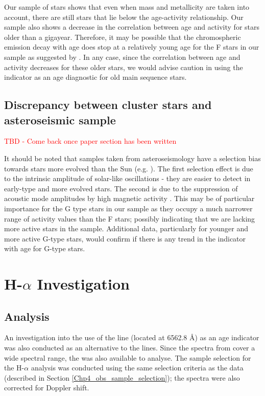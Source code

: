 Our sample of stars shows that even when mass and metallicity are taken into account, there are still stars that lie below the age-activity relationship. Our sample also shows a decrease in the correlation between age and activity for stars older than a gigayear. Therefore, it may be possible that the chromospheric emission decay with age does stop at a relatively young age for the F stars in our sample as suggested by \citet{Pace_2013}. In any case, since the correlation between age and activity decreases for these older stars, we would advise caution in using the \Rprime indicator as an age diagnostic for old main sequence stars.

\subsection{Discrepancy between cluster stars and asteroseismic sample}

\textcolor{red}{TBD - Come back once paper section has been written}

It should be noted that samples taken from asteroseismology have a selection bias towards stars more evolved than the Sun (e.g. \citealt{Metcalfe_etal_2016}). The first selection effect is due to the intrinsic amplitude of solar-like oscillations \citep{Houdek_etal_1999} - they are easier to detect in early-type and more evolved stars. The second is due to the suppression of acoustic mode amplitudes by high magnetic activity \citep{Chaplin_etal_2011_stellar_activity}. This may be of particular importance for the G type stars in our sample as they occupy a much narrower range of activity values than the F stars; possibly indicating that we are lacking more active stars in the sample. Additional data, particularly for younger and more active G-type stars, would confirm if there is any trend in the \Rprime indicator with age for G-type stars.

\section{\texorpdfstring{H-$\alpha$}{H-alpha} Investigation}
\label{Chp4_halpha}
\subsection{Analysis}
An investigation into the use of the \Halpha line (located at 6562.8 \AA) as an age indicator was also conducted as an alternative to the \caII lines. Since the spectra from \citet{Bruntt_etal_2012} cover a wide spectral range, the \Halpha was also available to analyse. The sample selection for the H-$\alpha$ analysis was conducted using the same selection criteria as the \caII data (described in Section \ref{Chp4_obs_sample_selection}); the spectra were also corrected for Doppler shift.

